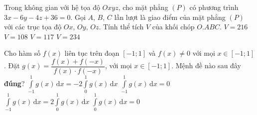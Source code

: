 \begin{ex}%
Trong không gian với hệ tọa độ $Oxyz$, cho mặt phẳng $(P)$ có phương trình $3x-6y-4z + 36 = 0$. Gọi $A$, $B$, $C$ lần lượt là giao điểm của mặt phẳng $(P)$ với các trục tọa độ $Ox$, $Oy$, $Oz$. Tính thể tích $V$ của khối chóp $O.ABC$.
\choice
{$V = 216$}
{\True $V = 108$}
{$V = 117$}
{$V = 234$}
\end{ex}	

\begin{ex}%
Cho hàm số $f(x)$ liên tục trên đoạn $[-1;1]$ và $f(x) \neq 0$ với mọi $x \in [-1;1]$. Đặt $g(x) = \dfrac{f(x) + f(-x)}{f(x) \cdot f(-x)}$, với mọi $x \in [-1;1]$. Mệnh đề nào sau đây \textbf{đúng}?
\choice
{$\displaystyle\int\limits_{-1}^{1} g(x) \mathrm{\,d}x = -2\displaystyle\int\limits_{0}^{1} g(x) \mathrm{\,d}x$}
{$\displaystyle\int\limits_{-1}^{1} g(x) \mathrm{\,d}x =0$}
{\True $\displaystyle\int\limits_{-1}^{1} g(x) \mathrm{\,d}x = 2\displaystyle\int\limits_{0}^{1} g(x) \mathrm{\,d}x$}
{$\displaystyle\int\limits_{0}^{1} g(x) \mathrm{\,d}x =0$}
\end{ex}

